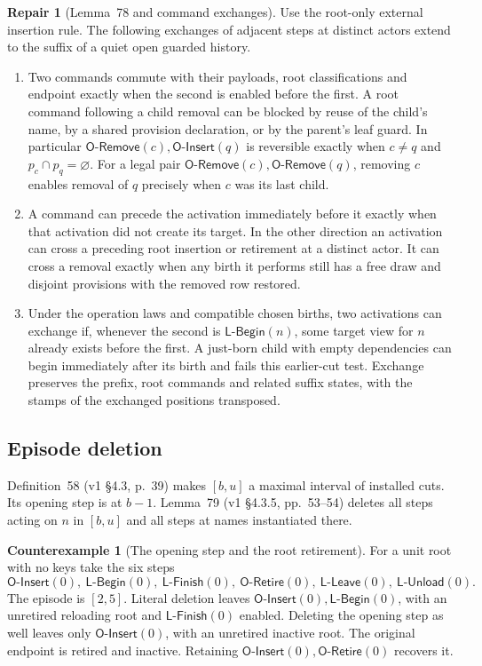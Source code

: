 \documentclass[11pt,a4paper]{article}
\theoremstyle{definition}
\newtheorem{counterexample}[definition]{Counterexample}
\newtheorem{repair}[definition]{Repair}
\theoremstyle{plain}
\newcommand{\OInsert}{\mathsf{O\text{-}Insert}}
\newcommand{\ORetire}{\mathsf{O\text{-}Retire}}
\newcommand{\ORemove}{\mathsf{O\text{-}Remove}}
\newcommand{\LBegin}{\mathsf{L\text{-}Begin}}
\newcommand{\LFinish}{\mathsf{L\text{-}Finish}}
\newcommand{\LLeave}{\mathsf{L\text{-}Leave}}
\newcommand{\LUnload}{\mathsf{L\text{-}Unload}}
\begin{document}
\begin{repair}[Lemma~78 and command exchanges]
Use the root-only external insertion rule. The following exchanges of adjacent steps at distinct actors extend to the suffix of a quiet open guarded history.
\begin{enumerate}
\item Two commands commute with their payloads, root classifications and endpoint exactly when the second is enabled before the first. A root command following a child removal can be blocked by reuse of the child's name, by a shared provision declaration, or by the parent's leaf guard. In particular $\ORemove(c),\OInsert(q)$ is reversible exactly when $c\ne q$ and $p_c\cap p_q=\varnothing$. For a legal pair $\ORemove(c),\ORemove(q)$, removing $c$ enables removal of $q$ precisely when $c$ was its last child.
\item A command can precede the activation immediately before it exactly when that activation did not create its target. In the other direction an activation can cross a preceding root insertion or retirement at a distinct actor. It can cross a removal exactly when any birth it performs still has a free draw and disjoint provisions with the removed row restored.
\item Under the operation laws and compatible chosen births, two activations can exchange if, whenever the second is $\LBegin(n)$, some target view for $n$ already exists before the first. A just-born child with empty dependencies can begin immediately after its birth and fails this earlier-cut test. Exchange preserves the prefix, root commands and related suffix states, with the stamps of the exchanged positions transposed.
\end{enumerate}
\end{repair}

\subsection{Episode deletion}
\label{sec:excision}

Definition~58 (v1 \S4.3, p.~39) makes $[b,u]$ a maximal interval of installed cuts. Its opening step is at $b-1$. Lemma~79 (v1 \S4.3.5, pp.~53--54) deletes all steps acting on $n$ in $[b,u]$ and all steps at names instantiated there.

\begin{counterexample}[The opening step and the root retirement]
For a unit root with no keys take the six steps
\[
 \OInsert(0),\ \LBegin(0),\ \LFinish(0),\
 \ORetire(0),\ \LLeave(0),\ \LUnload(0).
\]
The episode is $[2,5]$. Literal deletion leaves $\OInsert(0),\LBegin(0)$, with an unretired reloading root and $\LFinish(0)$ enabled. Deleting the opening step as well leaves only $\OInsert(0)$, with an unretired inactive root. The original endpoint is retired and inactive. Retaining $\OInsert(0),\ORetire(0)$ recovers it.
\end{counterexample}
\end{document}
